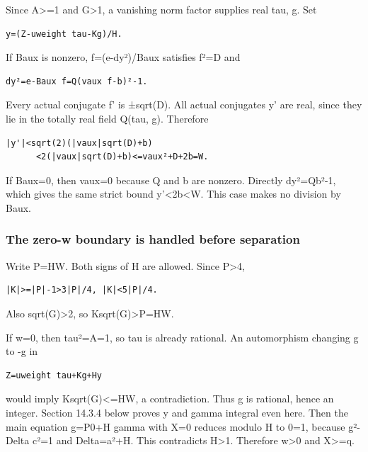 \documentclass[
  10pt,
]{article}
\begin{document}
Since A\textgreater=1 and G\textgreater1, a vanishing norm factor
supplies real tau, g. Set

\begin{verbatim}
y=(Z-uweight tau-Kg)/H.
\end{verbatim}

If Baux is nonzero, f=(e-dy²)/Baux satisfies f²=D and

\begin{verbatim}
dy²=e-Baux f=Q(vaux f-b)²-1.
\end{verbatim}

Every actual conjugate f' is ±sqrt(D). All actual conjugates y' are
real, since they lie in the totally real field Q(tau, g). Therefore

\begin{verbatim}
|y'|<sqrt(2)(|vaux|sqrt(D)+b)
      <2(|vaux|sqrt(D)+b)<=vaux²+D+2b=W.
\end{verbatim}

If Baux=0, then vaux=0 because Q and b are nonzero. Directly dy²=Qb²-1,
which gives the same strict bound
\textbar y'\textbar\textless2b\textless W. This case makes no division
by Baux.

\subsubsection{The zero-w boundary is handled before
separation}\label{the-zero-w-boundary-is-handled-before-separation}

Write P=HW. Both signs of H are allowed. Since
\textbar P\textbar\textgreater4,

\begin{verbatim}
|K|>=|P|-1>3|P|/4, |K|<5|P|/4.
\end{verbatim}

Also sqrt(G)\textgreater2, so
\textbar K\textbar sqrt(G)\textgreater\textbar P\textbar=\textbar H\textbar W.

If w=0, then tau²=A=1, so tau is already rational. An automorphism
changing g to -g in

\begin{verbatim}
Z=uweight tau+Kg+Hy
\end{verbatim}

would imply \textbar K\textbar sqrt(G)\textless=\textbar H\textbar W, a
contradiction. Thus g is rational, hence an integer. Section 14.3.4
below proves y and gamma integral even here. Then the main equation
g=P0+H gamma with X=0 reduces modulo H to 0=1, because g²-Delta c²=1 and
Delta=a²+H. This contradicts \textbar H\textbar\textgreater1. Therefore
w\textgreater0 and X\textgreater=q.
\end{document}
